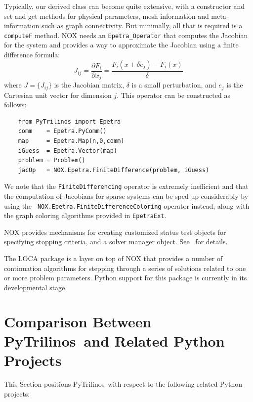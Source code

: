 \documentclass[acmtocl]{acmtrans2m}
\newcommand{\PyTrilinos}{{PyTrilinos}}
\begin{document}
Typically, our derived class can become quite extensive, with a
constructor and set and get methods for physical parameters, mesh
information and meta-information such as graph connectivity.  But
minimally, all that is required is a {\tt computeF} method.  NOX needs
an {\tt Epetra\_Operator} that computes the Jacobian for the system
and provides a way to approximate the Jacobian using a finite
difference formula:
\begin{equation}
  J_{ij} = \frac{\partial F_i}{\partial x_j} = \frac{F_i(x+\delta e_j)
    - F_i(x)}{\delta}
\end{equation}
where $J=\{J_{ij}\}$ is the Jacobian matrix, $\delta$ is a small
perturbation, and $e_j$ is the Cartesian unit vector for dimension
$j$.  This operator can be constructed as follows:
\begin{verbatim}
    from PyTrilinos import Epetra
    comm    = Epetra.PyComm()
    map     = Epetra.Map(n,0,comm)
    iGuess  = Epetra.Vector(map)
    problem = Problem()
    jacOp   = NOX.Epetra.FiniteDifference(problem, iGuess)
\end{verbatim}
We note that the {\tt FiniteDifferencing} operator is extremely
inefficient and that the computation of Jacobians for sparse systems
can be sped up considerably by using the {\tt
  NOX.Epetra.FiniteDifferenceColoring} operator instead, along with
the graph coloring algorithms provided in {\tt EpetraExt}.

NOX provides mechanisms for creating customized status test objects
for specifying stopping criteria, and a solver manager object.
See~\cite{NOX-home-page} for details.

The LOCA package is a layer on top of NOX that provides a number of
continuation algorithms for stepping through a series of solutions
related to one or more problem parameters.  Python support for this
package is currently in its developmental stage.

\section{Comparison Between \PyTrilinos\ and Related Python Projects}
\label{sec:comparison_python}

This Section positions \PyTrilinos\ with respect to the following
related Python projects:
\end{document}
